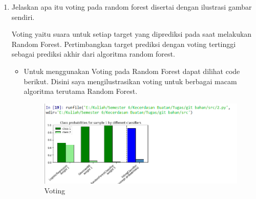 \begin{enumerate}
\item Jelaskan apa itu voting pada random forest disertai dengan ilustrasi gambar sendiri.\par
Voting yaitu suara untuk setiap target yang diprediksi pada saat melakukan Random Forest. Pertimbangkan target prediksi dengan voting tertinggi sebagai prediksi akhir dari algoritma random forest.
\begin{itemize}
\item
Untuk menggunakan Voting pada Random Forest dapat dilihat code berikut. Disini saya mengilustrasikan voting untuk berbagai macam algoritma terutama Random Forest.
\begin{figure}[ht]
\centering
\includegraphics[scale=0.5]{figures/1174031/3/2.PNG}
\caption{Voting}
\label{contoh}
\end{figure}
\end{itemize}
\end{enumerate}


